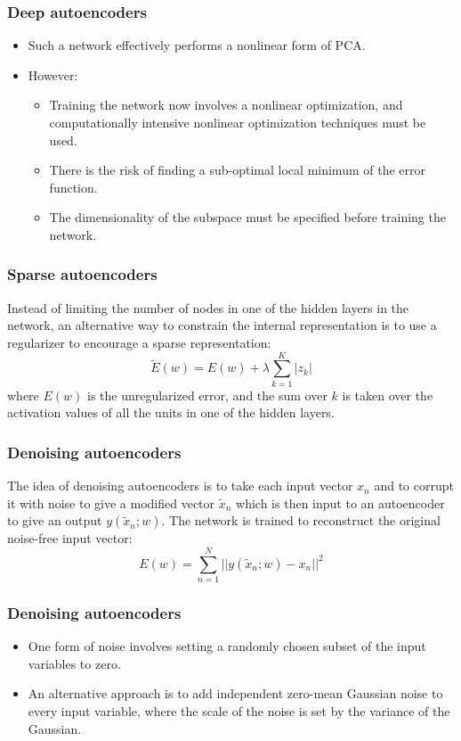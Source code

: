 \documentclass{beamer}
\begin{document}
\begin{frame}
    \frametitle{Deep autoencoders}
    \begin{itemize}
        \item Such a network effectively performs a nonlinear form of PCA.
        \item However:
        \begin{itemize}
            \item Training the network now involves a nonlinear optimization, and computationally intensive nonlinear optimization techniques must be used.
            \item There is the risk of finding a sub-optimal local minimum of the error function.
            \item The dimensionality of the subspace must be specified before training the network.
        \end{itemize}
    \end{itemize}
\end{frame}

\begin{frame}
    \frametitle{Sparse autoencoders}
    Instead of limiting the number of nodes in one of the hidden layers in the network, an alternative way to constrain the internal representation is to use a regularizer to encourage a sparse representation:
    \begin{equation*}
        \tilde{E}(w)=E(w)+\lambda\sum_{k=1}^{K}|z_{k}|
    \end{equation*}
    where $E(w)$ is the unregularized error, and the sum over $k$ is taken over the activation values of all the units in one of the hidden layers.
\end{frame}

\begin{frame}
    \frametitle{Denoising autoencoders}
    The idea of denoising autoencoders is to take each input vector $x_{n}$ and to corrupt it with noise to give a modified vector $\tilde{x}_{n}$ which is then input to an autoencoder to give an output $y(\tilde{x}_{n};w)$. The network is trained to reconstruct the original noise-free input vector:
    \begin{equation*}
        E(w)=\sum_{n=1}^{N}||y(\tilde{x}_{n};w)-x_{n}||^{2}
    \end{equation*}
\end{frame}

\begin{frame}
    \frametitle{Denoising autoencoders}
    \begin{itemize}
        \item One form of noise involves setting a randomly chosen subset of the input variables to zero.
        \item An alternative approach is to add independent zero-mean Gaussian noise to every input variable, where the scale of the noise is set by the variance of the Gaussian.
    \end{itemize}
\end{frame}
\end{document}
